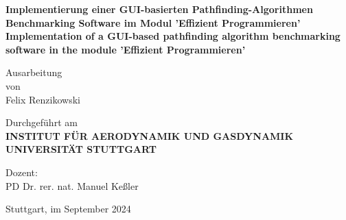 \begin{center}
	\begin{Large}
	\textbf{Implementierung einer GUI-basierten Pathfinding-Algorithmen Benchmarking Software im Modul 'Effizient Programmieren'}\\
	\vspace{1cm}
	\textbf{Implementation of a GUI-based pathfinding algorithm benchmarking software in the module 'Effizient Programmieren'}
\end{Large}

\vspace{4cm}

Ausarbeitung\\
von\\
Felix Renzikowski

\vspace{4cm}

Durchgef\"uhrt am\\
\vspace{0.5cm}
\textbf{INSTITUT F\"UR AERODYNAMIK UND GASDYNAMIK}\\
\textbf{UNIVERSIT\"AT STUTTGART}\\

\vspace{2cm}

Dozent:\\
PD Dr. rer. nat. Manuel Keßler


\vspace{2cm}

Stuttgart, im September 2024
\end{center}